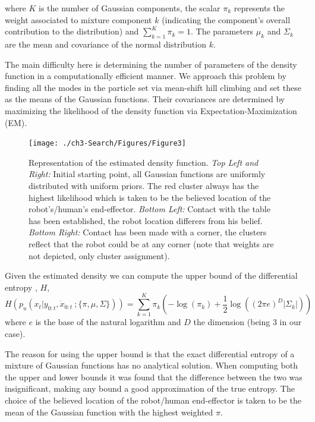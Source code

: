 where $K$ is the number of Gaussian components,  the scalar $\pi_{k}$ represents the weight associated to mixture component $k$ 
(indicating the component's overall contribution to the distribution) and $\sum_{k=1}^{K} \pi_{k} = 1$. The parameters $\mu_{k}$ 
and $\Sigma_{k}$ are the mean and covariance of the normal distribution $k$. 

The main difficulty here is determining the number of parameters of the density function in a computationally efficient manner.
We approach this problem by finding all the modes in the particle set via mean-shift hill climbing and set these as the 
means of the Gaussian functions. Their covariances are determined by maximizing the likelihood of the density function 
via Expectation-Maximization (EM). 
%
%

\begin{figure}
 \centering
   \texttt{[image: ./ch3-Search/Figures/Figure3]}
  \caption{Representation of the estimated density function. \textit{Top Left and Right:} Initial starting point, 
  all Gaussian functions are uniformly distributed with uniform priors. The red cluster always has the highest likelihood which is taken
  to be the believed location of the robot's/human's end-effector. \textit{Bottom Left:} Contact with the table has been established, the robot location differers
  from his belief. \textit{Bottom Right:} Contact has been made with a corner, the clusters reflect that the robot could be at any corner (note that weights are not 
  depicted, only cluster assignment).}
  \label{fig:clustering}
\end{figure}

Given the estimated density we can compute the upper bound of the differential entropy \cite{DiffEntropyHuber2008}, $H$,
\begin{equation}
  H\left(  p_u(x_t|y_{0:t},\dot{x}_{0:t}\: ;\{\pi,\mu,\Sigma\}) \right) = \sum\limits_{k=1}^{K} \pi_{k} \left( -\log(\pi_{k}) + \frac{1}{2} \log((2\pi e)^{D} |\Sigma_{k}|) \right)
\end{equation}
where $e$ is the base of the natural logarithm and $D$ the dimension (being 3 in our case).

The reason for using the upper bound is that the exact differential entropy of a mixture of Gaussian functions has no 
analytical solution. When computing both the
upper and lower bounds it was found that the difference between the two was insignificant, making any bound a good approximation 
of the true entropy. The choice of the believed location of the robot/human end-effector is taken to be the mean of the 
Gaussian function with the highest weighted $\pi$.

